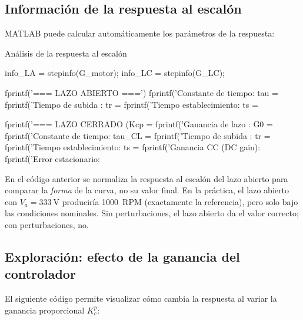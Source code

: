 \subsection{Información de la respuesta al escalón}

MATLAB puede calcular automáticamente los parámetros de la respuesta:

\begin{matlabcodetitulo}{Análisis de la respuesta al escalón}

info_LA = stepinfo(G_motor);
info_LC = stepinfo(G_LC);

fprintf('=== LAZO ABIERTO ===\n')
fprintf('Constante de tiempo: tau = %
fprintf('Tiempo de subida   : tr  = %
fprintf('Tiempo establecimiento: ts = %

fprintf('=== LAZO CERRADO (Kcp = %
fprintf('Ganancia de lazo   : G0  = %
fprintf('Constante de tiempo: tau_CL = %
fprintf('Tiempo de subida   : tr  = %
fprintf('Tiempo establecimiento: ts = %
fprintf('Ganancia CC (DC gain): %
fprintf('Error estacionario: %
\end{matlabcodetitulo}

\begin{observacion}
  En el código anterior se normaliza la respuesta al escalón del lazo
  abierto para comparar la \textit{forma} de la curva, no su valor final.
  En la práctica, el lazo abierto con $V_a = \SI{333}{\volt}$ produciría
  \SI{1000}{RPM} (exactamente la referencia), pero solo bajo las condiciones
  nominales. Sin perturbaciones, el lazo abierto da el valor correcto;
  con perturbaciones, no.
\end{observacion}

\subsection{Exploración: efecto de la ganancia del controlador}

El siguiente código permite visualizar cómo cambia la respuesta al variar
la ganancia proporcional $K_c^p$:

